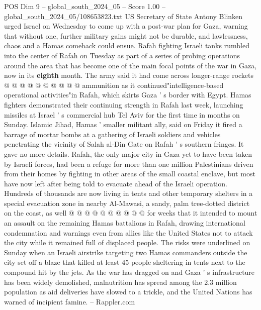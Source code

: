 \begin{textsample}{POS Dim 9 – global\_south\_2024\_05 – Score 1.00 – global\_south\_2024\_05/108653823.txt}
US Secretary of State Antony Blinken urged Israel on Wednesday to come up with a post-war plan for Gaza, warning that without one, further military gains might not be durable, and lawlessness, chaos and a Hamas comeback could ensue.
Rafah fighting Israeli tanks rumbled into the center of Rafah on Tuesday as part of a series of probing operations around the area that has become one of the main focal points of the war in Gaza, now in its \textbf{eighth} month.
The army said it had come across longer-range rockets @ @ @ @ @ @ @ @ @ @ ammunition as it continued"intelligence-based operational activities"in Rafah, which skirts Gaza ' s border with Egypt.
Hamas fighters demonstrated their continuing strength in Rafah last week, launching missiles at Israel ' s commercial hub Tel Aviv for the first time in months on Sunday.
Islamic Jihad, Hamas ' smaller militant ally, said on Friday it fired a barrage of mortar bombs at a gathering of Israeli soldiers and vehicles penetrating the vicinity of Salah al-Din Gate on Rafah ' s southern fringes.
It gave no more details.
Rafah, the only major city in Gaza yet to have been taken by Israeli forces, had been a refuge for more than one million Palestinians driven from their homes by fighting in other areas of the small coastal enclave, but most have now left after being told to evacuate ahead of the Israeli operation.
Hundreds of thousands are now living in tents and other temporary shelters in a special evacuation zone in nearby Al-Mawasi, a sandy, palm tree-dotted district on the coast, as well @ @ @ @ @ @ @ @ @ @ for weeks that it intended to mount an assault on the remaining Hamas battalions in Rafah, drawing international condemnation and warnings even from allies like the United States not to attack the city while it remained full of displaced people.
The risks were underlined on Sunday when an Israeli airstrike targeting two Hamas commanders outside the city set off a blaze that killed at least 45 people sheltering in tents next to the compound hit by the jets.
As the war has dragged on and Gaza ' s infrastructure has been widely demolished, malnutrition has spread among the 2.3 million population as aid deliveries have slowed to a trickle, and the United Nations has warned of incipient famine. -- Rappler.com

\end{textsample}
